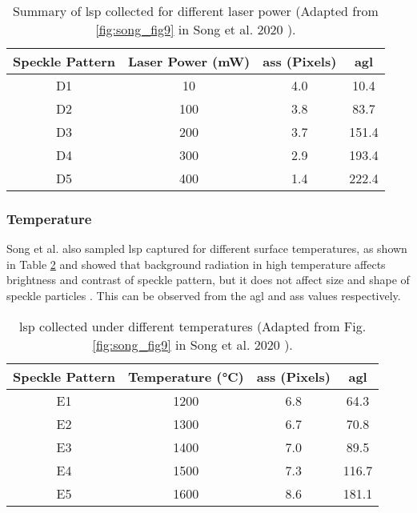     \begin{table}[ht]
        \centering
        \footnotesize
        \renewcommand{\arraystretch}{1.2}
        \begin{tabular}{cccc}
            \toprule
            \textbf{Speckle Pattern} & \textbf{Laser Power (mW)} & \textbf{\gls{ass} (Pixels)} & \textbf{\gls{agl}} \\
            \midrule
            
            D1 & 10 & 4.0 & 10.4 \\
            D2 & 100 & 3.8 & 83.7 \\
            D3 & 200 & 3.7 & 151.4 \\
            D4 & 300 & 2.9 & 193.4 \\
            D5 & 400 & 1.4 & 222.4 \\
    
            \bottomrule
        \end{tabular}
        \caption{Summary of \gls{lsp} collected for different laser power (Adapted from \ref{fig:song_fig9} in Song et al. 2020 \cite{song}).}
        \label{table:song_table_d}
    \end{table}


    \subsubsection{Temperature}
    Song et al. also sampled \gls{lsp} captured for different surface temperatures, as shown in Table \ref{table:song_table_e} and showed that background radiation in high temperature affects brightness and contrast of speckle pattern, but it does not affect size and shape of speckle particles \cite{song}. This can be observed from the \gls{agl} and \gls{ass} values respectively.

    \begin{table}[ht]
        \centering
        \footnotesize
        \renewcommand{\arraystretch}{1.2}
        \begin{tabular}{cccc}
            \toprule
            \textbf{Speckle Pattern} & \textbf{Temperature (°C)} & \textbf{\gls{ass} (Pixels)} & \textbf{\gls{agl}} \\
            \midrule
            
            E1 & 1200 & 6.8 & 64.3 \\
            E2 & 1300 & 6.7 & 70.8 \\
            E3 & 1400 & 7.0 & 89.5 \\
            E4 & 1500 & 7.3 & 116.7 \\
            E5 & 1600 & 8.6 & 181.1 \\
    
            \bottomrule
        \end{tabular}
        \caption{\gls{lsp} collected under different temperatures (Adapted from Fig. \ref{fig:song_fig9} in Song et al. 2020 \cite{song}).}
        \label{table:song_table_e}
    \end{table}
    

